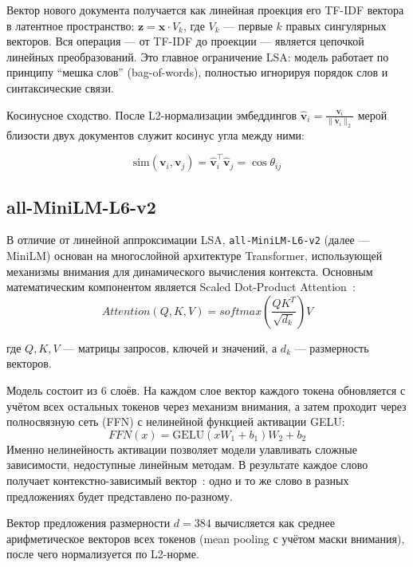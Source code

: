 Вектор нового документа получается как линейная проекция его TF-IDF
вектора в латентное пространство: \( \mathbf{z} = \mathbf{x} \cdot V_k \),
где \( V_k \) --- первые \( k \) правых сингулярных векторов.
Вся операция --- от TF-IDF до проекции --- является цепочкой линейных
преобразований. Это главное ограничение LSA: модель работает по
принципу \enquote{мешка слов} (bag-of-words), полностью игнорируя
порядок слов и синтаксические связи.

Косинусное сходство. После L2-нормализации эмбеддингов
\(\hat{\mathbf{v}}_i = \frac{\mathbf{v}_i}{\|\mathbf{v}_i\|_2}\) мерой
близости двух документов служит косинус угла между ними:

\begin{displaymath}
  \text{sim}(\mathbf{v}_i, \mathbf{v}_j) = \hat{\mathbf{v}}_i^\top
  \hat{\mathbf{v}}_j = \cos\theta_{ij}
\end{displaymath}

\subsection{all-MiniLM-L6-v2}

В отличие от линейной аппроксимации LSA, \texttt{all-MiniLM-L6-v2}
(далее --- MiniLM) основан на многослойной
архитектуре Transformer, использующей механизмы внимания для динамического
вычисления контекста. Основным математическим компонентом является Scaled
Dot-Product Attention~\cite{vaswani2017attention}:
\[
  Attention(Q, K, V) = softmax(\frac{QK^T}{\sqrt{d_k}})V
\]

где \( Q, K, V \) --- матрицы запросов, ключей и значений, а \( d_k \) ---
размерность векторов.

Модель состоит из 6 слоёв. На каждом слое вектор каждого токена
обновляется с учётом всех остальных токенов через механизм внимания,
а затем проходит через полносвязную сеть (FFN) с нелинейной функцией
активации GELU:
\[
  FFN(x) = \mathrm{GELU}(xW_1 + b_1)W_2 + b_2
\]
Именно нелинейность активации позволяет модели улавливать сложные
зависимости, недоступные линейным методам. В результате каждое слово
получает контекстно-зависимый вектор~\cite{devlin2019bert}: одно и то же слово в разных
предложениях будет представлено по-разному.

Вектор предложения размерности $d = 384$ вычисляется как среднее
арифметическое векторов всех токенов (mean pooling с учётом маски
внимания), после чего нормализуется по L2-норме.
